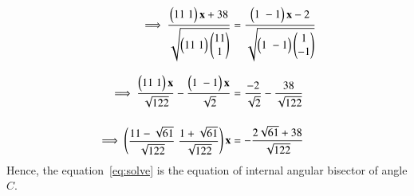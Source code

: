 \documentclass[journal,12pt,twocolumn]{IEEEtran}
\theoremstyle{remark}
\begin{document}
\begin{align}
\implies\dfrac{\begin{pmatrix}11\;1\end{pmatrix}\mathbf{x}+38}{\sqrt{\begin{pmatrix}11\;1\end{pmatrix}\begin{pmatrix}11\\1\end{pmatrix}}}&=\dfrac{\begin{pmatrix}1\;-1\end{pmatrix}\mathbf{x}-2}{\sqrt{\begin{pmatrix}1\;-1\end{pmatrix}\begin{pmatrix}1\\-1\end{pmatrix}}}\\[8pt]
\implies\dfrac{\begin{pmatrix}11\;1\end{pmatrix}\mathbf{x}}{\sqrt{122}} - \dfrac{\begin{pmatrix}1\;-1\end{pmatrix}\mathbf{x}}{\sqrt{2}}&=\dfrac{-2}{\sqrt{2}} - \dfrac{38}{\sqrt{122}}\\[12pt]
\label{eq:solve}\implies\begin{pmatrix}\dfrac{11-\sqrt{61}}{\sqrt{122}} \; \dfrac{1+\sqrt{61}}{\sqrt{122}}\end{pmatrix}\mathbf{x}&=-\dfrac{2\sqrt{61}+38}{\sqrt{122}}
\end{align}
Hence, the equation~\eqref{eq:solve} is the equation of internal angular bisector of angle $C$.
\end{document}
